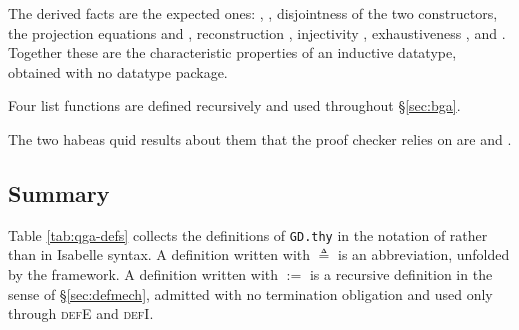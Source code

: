 
\noindent
The derived facts are the expected ones: ,
, disjointness of the two
constructors, the projection equations  and
, reconstruction
,
injectivity , exhaustiveness
, and
.  Together these are the characteristic properties of an
inductive datatype, obtained with no datatype package.

Four list functions are defined recursively and used throughout
\S\ref{sec:bga}.


\noindent
The two habeas quid results about them that the proof checker relies on are
 and
.

\subsection{Summary}
\label{sec:qga-summary}

Table \ref{tab:qga-defs} collects the definitions of \texttt{GD.thy} in the
notation of \QGA{} rather than in Isabelle syntax.  A definition written with $\triangleq$ is an
abbreviation, unfolded by the framework.  A definition written with $:=$ is a
\QGA{} recursive definition in the sense of \S\ref{sec:defmech}, admitted with
no termination obligation and used only through \textsc{defE} and
\textsc{defI}.

